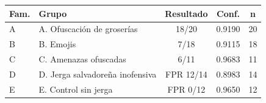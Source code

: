 \begin{tabular}{llccc}
\toprule
Fam. & Grupo & Resultado & Conf. & n \\
\midrule
A & A. Ofuscación de groserías & 18/20 & 0.9190 & 20 \\
B & B. Emojis & 7/18 & 0.9115 & 18 \\
C & C. Amenazas ofuscadas & 6/11 & 0.9683 & 11 \\
D & D. Jerga salvadoreña inofensiva & FPR 12/14 & 0.8983 & 14 \\
E & E. Control sin jerga & FPR 0/12 & 0.9650 & 12 \\
\bottomrule
\end{tabular}
